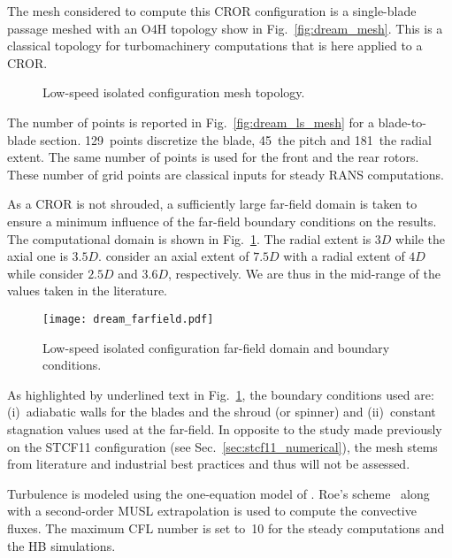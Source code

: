 
The mesh considered to compute this
CROR configuration is a single-blade passage meshed
with an O4H topology show in Fig.~\ref{fig:dream_mesh}. This is a classical
topology for turbomachinery computations that is here applied to 
a CROR.
\begin{figure}[htb]
  \centering
  \caption{Low-speed isolated configuration mesh topology.}
\end{figure}
The number of points is reported in 
Fig.~\ref{fig:dream_ls_mesh} for a blade-to-blade section. 
129~points discretize the blade, 45~the pitch and 181~the radial
extent. The same number of points is used for the front
and the rear rotors. These number of grid points are
classical inputs for steady RANS computations.

As a CROR is not shrouded, a sufficiently large
far-field domain is taken to ensure a minimum influence
of the far-field boundary conditions on the results.
The computational domain is shown in Fig.~\ref{fig:dream_farfield}.
The radial extent is $3D$ while the axial one is $3.5D$.
\citet{Peters2012} consider an axial extent of $7.5D$
with a radial extent of $4D$ while \citet{Zachariadis2011}
consider $2.5D$ and $3.6D$, respectively. We are thus in 
the mid-range of the values taken in the literature.
\begin{figure}[htb]
  \centering
  \texttt{[image: dream\_farfield.pdf]}
  \caption{Low-speed isolated configuration far-field domain and boundary conditions.}
  \label{fig:dream_farfield}
\end{figure}
As highlighted by underlined text in Fig.~\ref{fig:dream_farfield},
the boundary conditions used are: (i)~adiabatic walls
for the blades and the shroud (or spinner) and (ii)~constant
stagnation values used at the far-field.
In opposite to the study made previously on the STCF11
configuration (see Sec.~\ref{sec:stcf11_numerical}),
the mesh stems from literature and industrial best
practices and thus will not be assessed.

Turbulence is modeled using the one-equation model of
\citet{Spalart1992}.  Roe's scheme~\cite{Roe1981} along with a 
second-order MUSL extrapolation 
is used to compute the convective fluxes.
The maximum CFL number is set to~10 for the steady 
computations and the HB simulations.

